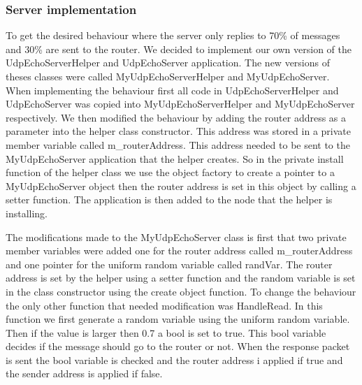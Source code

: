 \documentclass{article}
\begin{document}
\subsubsection{Server implementation}
To get the desired behaviour where the server only replies to 70\% of messages and 30\% are sent to the router.
We decided to implement our own version of the UdpEchoServerHelper and UdpEchoServer application.
The new versions of theses classes were called MyUdpEchoServerHelper and MyUdpEchoServer.
When implementing the behaviour first all code in UdpEchoServerHelper and UdpEchoServer was copied into MyUdpEchoServerHelper and MyUdpEchoServer respectively.
We then modified the behaviour by adding the router address as a parameter into the helper class constructor.
This address was stored in a private member variable called m\_routerAddress.
This address needed to be sent to the MyUdpEchoServer application that the helper creates.
So in the private install function of the helper class we use the object factory to create a pointer to a MyUdpEchoServer object then the router address is set in this object by calling a setter function.
The application is then added to the node that the helper is installing.

The modifications made to the MyUdpEchoServer class is first that two private member variables were added one for the router address called m\_routerAddress and one pointer for the uniform random variable called randVar.
The router address is set by the helper using a setter function and the random variable is set in the class constructor using the create object function.
To change the behaviour the only other function that needed modification was HandleRead.
In this function we first generate a random variable using the uniform random variable.
Then if the value is larger then 0.7 a bool is set to true.
This bool variable decides if the message should go to the router or not.
When the response packet is sent the bool variable is checked and the router address i applied if true and the sender address is applied if false.
\end{document}
